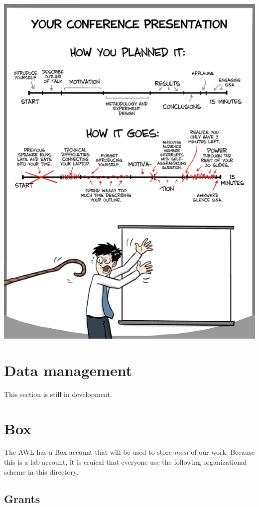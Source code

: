 \documentclass[]{book}
\begin{document}
\includegraphics{images/conference_talk.gif}

\hypertarget{data-management}{%
\section{Data management}\label{data-management}}

This section is still in development.

\hypertarget{box}{%
\section{Box}\label{box}}

The AWL has a Box account that will be used to store \emph{most} of our work. Because this is a lab account, it is cruical that everyone use the following organizational scheme in this directory.

\hypertarget{grants}{%
\subsection{Grants}\label{grants}}
\end{document}
